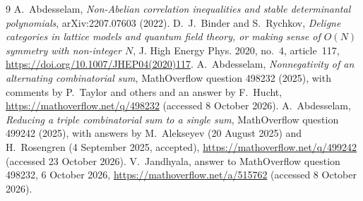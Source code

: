\documentclass[11pt]{amsart}
\theoremstyle{remark}
\begin{document}
\begin{thebibliography}{9}
 A.~Abdesselam, \emph{Non-Abelian correlation inequalities and stable determinantal polynomials}, arXiv:2207.07603 (2022).
 D.~J.~Binder and S.~Rychkov, \emph{Deligne categories in lattice models and quantum field theory, or making sense of $O(N)$ symmetry with non-integer $N$}, J. High Energy Phys. 2020, no.~4, article~117, \url{https://doi.org/10.1007/JHEP04(2020)117}.
 A.~Abdesselam, \emph{Nonnegativity of an alternating combinatorial sum}, MathOverflow question 498232 (2025), with comments by P.~Taylor and others and an answer by F.~Hucht, \url{https://mathoverflow.net/q/498232} (accessed 8 October 2026).
 A.~Abdesselam, \emph{Reducing a triple combinatorial sum to a single sum}, MathOverflow question 499242 (2025), with answers by M.~Alekseyev (20 August 2025) and H.~Rosengren (4 September 2025, accepted), \url{https://mathoverflow.net/q/499242} (accessed 23 October 2026).
 V.~Jandhyala, answer to MathOverflow question 498232, 6 October 2026, \url{https://mathoverflow.net/a/515762} (accessed 8 October 2026).
\end{thebibliography}
\end{document}
